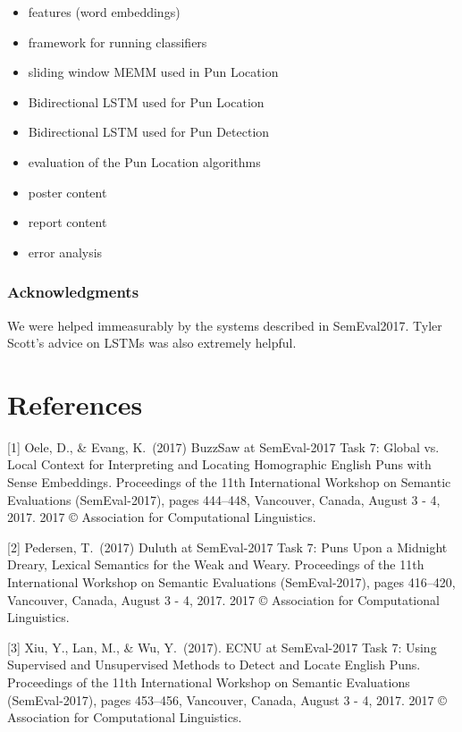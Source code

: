 \documentclass{article}
\begin{document}
\begin{itemize}
\begin{itemize}
		\item features (word embeddings)
		\item framework for running classifiers
		\item sliding window MEMM used in Pun Location
		\item Bidirectional LSTM used for Pun Location
		\item Bidirectional LSTM used for Pun Detection
		\item evaluation of the Pun Location algorithms
		\item poster content
		\item report content
		\item error analysis
	\end{itemize}
\end{itemize}

\subsubsection*{Acknowledgments}

We were helped immeasurably by the systems described in SemEval2017. Tyler
Scott's advice on LSTMs was also extremely helpful.

\section*{References}

\medskip

\small

[1] Oele, D., \& Evang, K.\ (2017) BuzzSaw at SemEval-2017 Task 7:
Global vs. Local Context for Interpreting and Locating Homographic English Puns
with Sense Embeddings. Proceedings of the 11th International Workshop on
Semantic Evaluations (SemEval-2017), pages 444–448, Vancouver, Canada, August 3
- 4, 2017. 2017 © Association for Computational Linguistics.

[2] Pedersen, T.\ (2017) Duluth at SemEval-2017 Task 7: Puns Upon a Midnight
Dreary, Lexical Semantics for the Weak and Weary. Proceedings of the 11th
International Workshop on Semantic Evaluations (SemEval-2017), pages 416–420,
Vancouver, Canada, August 3 - 4, 2017. 2017 © Association for Computational
Linguistics.

[3] Xiu, Y., Lan, M., \& Wu, Y.\ (2017). ECNU at SemEval-2017 Task 7: Using
Supervised and Unsupervised Methods to Detect and Locate English Puns.
Proceedings of the 11th International Workshop on Semantic Evaluations
(SemEval-2017), pages 453–456, Vancouver, Canada, August 3 - 4, 2017. 2017 ©
Association for Computational Linguistics.
\end{document}
